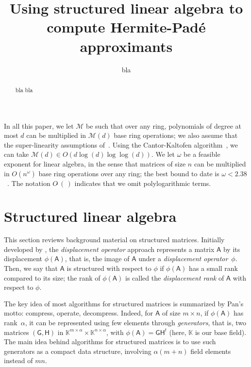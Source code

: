 \documentclass{sig-alternate}
\author{
\alignauthor
bla
\affaddr{blu} \\
\affaddr{bli}
\email{blo@ble}
}
\title{Using structured linear algebra to compute Hermite-Pad\'e
approximants}
\newcommand{\mA}{\ensuremath{\mathsf{A}}}
\newcommand{\mG}{\ensuremath{\mathsf{G}}}
\newcommand{\mH}{\ensuremath{\mathsf{H}}}
\newcommand{\K}{\ensuremath{\mathbb{K}}}
\newcommand{\M}{\ensuremath{\mathscr{M}}}
\newcommand{\Otilde}[1]{\ensuremath{O\tilde{~}(#1)}} %
\begin{document}
\maketitle

\begin{abstract}
bla bla
\end{abstract}



In all this paper, we let $\M$ be such that over any ring, polynomials
of degree at most $d$ can be multiplied in $\M(d)$ base ring
operations; we also assume that the super-linearity assumptions
of~\cite[Chapter~8]{GaGe13}. Using the Cantor-Kaltofen
algorithm~\cite{CaKa91}, we can take $\M(d)\in O(d
\log(d)\log\log(d))$. We let $\omega$ be a feasible exponent for
linear algebra, in the sense that matrices of size $n$ can be
multiplied in $O(n^\omega)$ base ring operations over any ring; the
best bound to date is $\omega < 2.38$~\cite{CoWi90, LeGall14}. The
notation $\Otilde{\,}$ indicates that we omit polylogarithmic terms.


\section{Structured linear algebra}

This section reviews background material on structured
matrices. Initially developed by \cite{KaKuMo79}, the {\it
  displacement operator} approach represents a matrix $\mA$ by its
displacement $\phi(\mA)$, that is, the image of $\mA$ under a
\textit{displacement operator}~$\phi$.  Then, we say that $\mA$ is
structured with respect to $\phi$ if $\phi(\mA)$ has a small rank
compared to its size; the rank of $\phi(\mA)$ is called the
\textit{displacement rank} of $\mA$ with respect to $\phi$.

The key idea of most algorithms for structured matrices is summarized
by Pan's motto: compress, operate, decompress. Indeed, for $\mA$ of
size $m \times n$, if $\phi(\mA)$ has rank~$\alpha$, it can be
represented using few elements through {\it generators}, that is, two
matrices $(\mG,\mH)$ in $\K^{m\times \alpha} \times \K^{n\times
  \alpha}$, with $\phi(\mA) = \mG \mH^t$ (here, $\K$ is our base
field).  The main idea behind algorithms for structured matrices is to
use such generators as a compact data structure, involving $\alpha
(m+n)$ field elements instead of $mn$.
\end{document}
